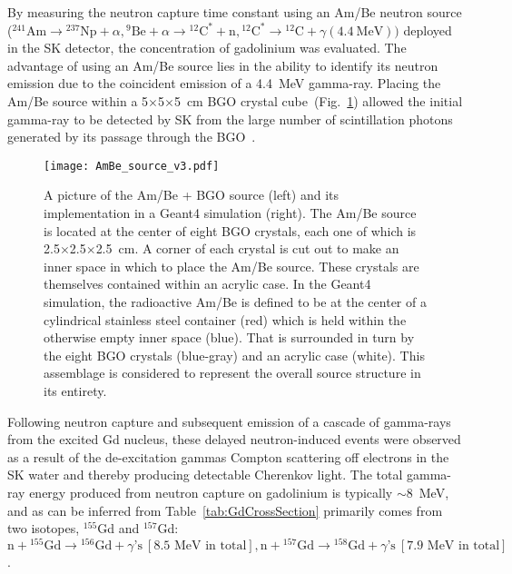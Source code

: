 \documentclass[preprint,12pt]{elsarticle}
\begin{document}
By measuring the neutron capture time constant using an Am/Be neutron source (${}^{241}\!\mathrm{Am}\rightarrow {}^{237}\mathrm{Np}+\alpha, {}^{9}\mathrm{Be}+\alpha\rightarrow {}^{12}\mathrm{C}^{*}+\mathrm{n}, {}^{12}\mathrm{C}^{*}\rightarrow{}^{12}\mathrm{C}+\gamma\mathrm{(4.4~MeV)})$ deployed in the SK detector, the concentration of gadolinium was evaluated.
The advantage of using an Am/Be source lies in the ability to identify its neutron emission due to the coincident emission of a 4.4~MeV gamma-ray.
Placing the Am/Be source within a 5$\times$5$\times$5~cm BGO crystal cube~(Fig.~\ref{fig:AmBe_source}) allowed 
the initial gamma-ray to be detected by SK from the large number of scintillation photons generated by its passage through the BGO~\cite{watanabe2009}.
\begin{figure}[htb]
	\centering\texttt{[image: AmBe\_source\_v3.pdf]}
	\caption{
	A picture of the Am/Be + BGO source (left) and its implementation in a Geant4 simulation (right).
	The Am/Be source is located at the center of eight BGO crystals, each one of which is 2.5$\times$2.5$\times$2.5~cm. A corner of each crystal is cut out to make an inner space in which to place the Am/Be source. These crystals are themselves contained within an acrylic case.
	In the Geant4 simulation, the radioactive Am/Be is defined to be at the center of a cylindrical stainless steel container (red) which is held within the otherwise empty inner space (blue). That is surrounded in turn by the eight BGO crystals (blue-gray) and an acrylic case (white).  This assemblage  is considered to represent the overall source structure in its entirety.
	}
	\label{fig:AmBe_source}
\end{figure}
Following neutron capture and subsequent emission of a cascade of gamma-rays from the excited Gd nucleus, these delayed neutron-induced events were observed as a result of the de-excitation gammas Compton scattering off electrons in the SK water and thereby producing detectable Cherenkov light. 
The total gamma-ray energy produced from neutron capture on gadolinium is typically $\sim$8~MeV, and as can be inferred from Table~\ref{tab:GdCrossSection} primarily comes from two isotopes, $^{155}$Gd and $^{157}$Gd:
	$\mbox{n}+{}^{155}\mbox{Gd}\rightarrow {}^{156}\mbox{Gd}+\gamma\mbox{'s}\ [\mbox{8.5~MeV\ in\ total}],
	\mbox{n}+{}^{157}\mbox{Gd}\rightarrow {}^{158}\mbox{Gd}+\gamma\mbox{'s}\ [\mbox{7.9~MeV\ in\ total}]$.
	
\end{document}
